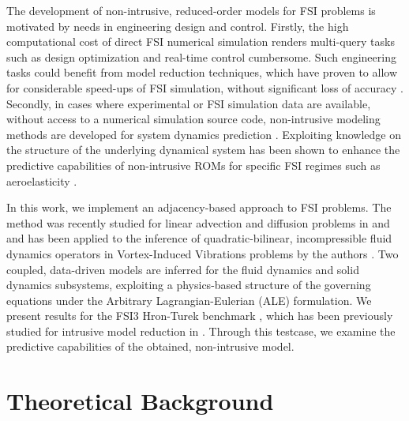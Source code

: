 \documentclass[%
  onecolumn
]{mpi2015-cscpreprint}
\begin{document}
The development of non-intrusive, reduced-order models for FSI problems is motivated by needs in engineering design and control. Firstly, the high computational cost of direct FSI numerical simulation renders multi-query tasks such as design optimization and real-time control cumbersome. Such engineering tasks could benefit from model reduction techniques, which have proven to allow for considerable speed-ups of FSI simulation, without significant loss of accuracy \cite{RozzaFSI}. Secondly, in cases where experimental or FSI simulation data are available, without access to a numerical simulation source code, non-intrusive modeling methods are developed for system dynamics prediction \cite{niromFSI}. Exploiting knowledge on the structure of the underlying dynamical system has been shown to enhance the predictive capabilities of non-intrusive ROMs for specific FSI regimes such as aeroelasticity \cite{OpInfAero}.

In this work, we implement an adjacency-based approach to FSI problems. The method was recently studied for linear advection and diffusion problems in \cite{SchuInf} and \cite{pidmd} and has been applied to the inference of quadratic-bilinear, incompressible fluid dynamics operators in Vortex-Induced Vibrations problems by the authors \cite{VIVinf}. Two coupled, data-driven models are inferred for the fluid dynamics and solid dynamics subsystems, exploiting a physics-based structure of the governing equations under the Arbitrary Lagrangian-Eulerian (ALE) formulation. We present results for the FSI3 Hron-Turek benchmark \cite{bench}, which has been previously studied for intrusive model reduction in \cite{RozzaFSI}. Through this testcase, we examine the predictive capabilities of the obtained, non-intrusive model.

\section{Theoretical Background}
\label{sec:theory}
\end{document}
